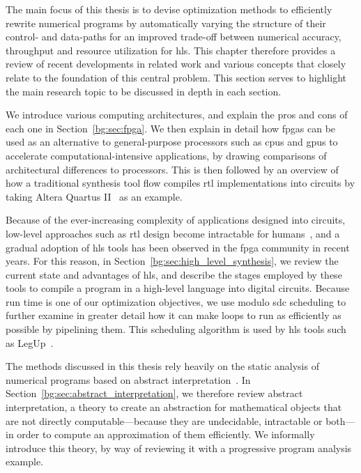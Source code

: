 The main focus of this thesis is to devise optimization methods to efficiently
rewrite numerical programs by automatically varying the structure of their
control- and data-paths for an improved trade-off between numerical accuracy,
throughput and resource utilization for \gls{hls}\@.  This chapter therefore
provides a review of recent developments in related work and various concepts
that closely relate to the foundation of this central problem.  This section
serves to highlight the main research topic to be discussed in depth in each
section.

We introduce various computing architectures, and explain the pros and cons
of each one in Section~\ref{bg:sec:fpga}.  We then explain in detail how
\glspl{fpga} can be used as an alternative to general-purpose processors
such as \glspl{cpu} and \glspl{gpu} to accelerate computational-intensive
applications, by drawing comparisons of architectural differences to
processors.  This is then followed by an overview of how a traditional
synthesis tool flow compiles \gls{rtl} implementations into circuits by taking
Altera Quartus II~\cite{quartus} as an example.

Because of the ever-increasing complexity of applications designed into
circuits, low-level approaches such as \gls{rtl} design become intractable
for humans~\cite{gajski}, and a gradual adoption of \gls{hls} tools has been
observed in the \gls{fpga} community in recent years.  For this reason, in
Section~\ref{bg:sec:high_level_synthesis}, we review the current state and
advantages of \gls{hls}, and describe the stages employed by these tools to
compile a program in a high-level language into digital circuits.  Because
run time is one of our optimization objectives, we use modulo \gls{sdc}
scheduling to further examine in greater detail how it can make loops to run as
efficiently as possible by pipelining them.  This scheduling algorithm is used
by \gls{hls} tools such as LegUp~\cite{legup}.

The methods discussed in this thesis rely heavily on the static analysis of
numerical programs based on abstract interpretation~\cite{cousot77}.  In
Section~\ref{bg:sec:abstract_interpretation}, we therefore review abstract
interpretation, a theory to create an abstraction for mathematical objects that
are not directly computable---because they are undecidable, intractable or
both---in order to compute an approximation of them efficiently.  We informally
introduce this theory, by way of reviewing it with a progressive program
analysis example.

